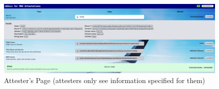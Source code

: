 \begin{figure}[hbt]
	\centering
		\includegraphics[width=1.0\textwidth]{Pictures/faa_attest_page.png}
	\caption{Attester's Page (attesters only see information specified for them)}
	\label{fig:attest}
\end{figure}
